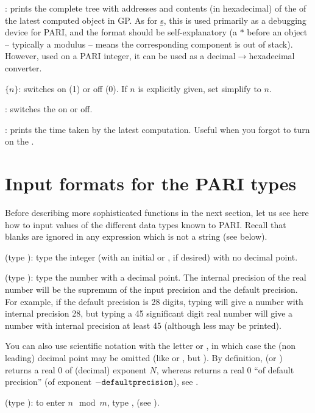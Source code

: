: prints the complete tree with addresses and contents (in
hexadecimal) of the  of the latest computed
object in GP. As for \b{s}, this is used primarily as a debugging device for
PARI, and the format should be self-explanatory (a $*$ before an object --
typically a modulus -- means the corresponding component is out of stack).
However, used on a PARI integer, it can be used as a
decimal$\rightarrow$hexadecimal converter.

 $\{n\}$: switches  on (1) or off (0). If $n$
is explicitly given, set simplify to $n$.

\subseckbd{\#}: switches the  on or off.

\subseckbd{\#\#}: prints the time taken by the latest computation.
Useful when you forgot to turn on the .

\section{Input formats for the PARI types}

\noindent
Before describing more sophisticated functions in the next section, let us
see here how to input values of the different data types known to PARI.
Recall that blanks are ignored in any expression which is not a string (see
below).

 
(type ): type the integer (with an initial
\kbd{+} or \kbd{-}, if desired) with no decimal point.

 
(type ): type the number with a decimal
point. The internal precision of the real number will be the supremum of the
input precision and the default precision. For example, if the default
precision is 28 digits, typing  will give a number with internal
precision 28, but typing a 45 significant digit real number will give a
number with internal precision at least 45 (although less may be printed).

You can also use scientific notation with the letter  or
, in which case the (non leading) decimal point may be omitted (like
 or , but  ). By definition,
 (or ) returns a real $0$ of (decimal) exponent
$N$, whereas  returns a real 0 ``of default precision'' (of exponent
$-{\tt defaultprecision}$), see .

(type ): to enter $n \mod m$, type
,   (see ).

